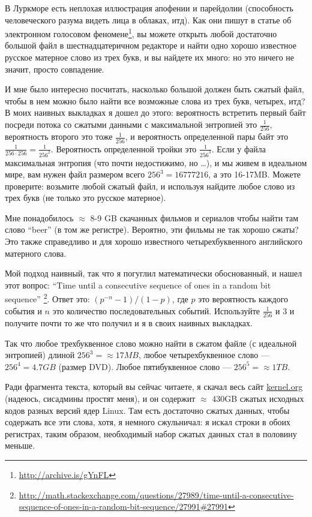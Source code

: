 В Луркморе есть неплохая иллюстрация апофении и парейдолии (способность человеческого разума видеть лица в облаках, итд).
Как они пишут в статье об электронном голосовом феномене\footnote{\url{http://archive.is/gYnFL}},
вы можете открыть любой достаточно большой файл в шестнадцатеричном редакторе и найти одно хорошо известное русское матерное слово из трех букв, и вы найдете их много: но это ничего не значит, просто совпадение.

И мне было интересно посчитать, насколько большой должен быть сжатый файл, чтобы в нем можно было найти все возможные слова из трех букв, четырех, итд?
В моих наивных выкладках я дошел до этого: вероятность встретить первый байт посреди потока со сжатыми данными с максимальной энтропией это 
$\frac{1}{256}$, вероятность второго это тоже $\frac{1}{256}$,
и вероятность определенной пары байт это $\frac{1}{256 \cdot 256} = \frac{1}{256^2}$.
Вероятность определенной тройки это $\frac{1}{256^3}$.
Если у файла максимальная энтропия (что почти недостижимо, но \dots), и мы живем в идеальном мире, вам нужен файл размером всего $256^3=16777216$, а это 16-17MB.
Можете проверите: возьмите любой сжатый файл, и используя  найдите любое слово из трех букв (не только это русское матерное).

Мне понадобилось $\approx$ 8-9 GB скачанных фильмов и сериалов чтобы найти там слово ``beer'' (в том же регистре).
Вероятно, эти фильмы не так хорошо сжаты?
Это также справедливо и для хорошо известного четырехбуквенного английского матерного слова.

Мой подход наивный, так что я погуглил математически обоснованный, и нашел этот вопрос:
``Time until a consecutive sequence of ones in a random bit sequence''
\footnote{\url{http://math.stackexchange.com/questions/27989/time-until-a-consecutive-sequence-of-ones-in-a-random-bit-sequence/27991#27991}}.
Ответ это: $(p^{−n}−1)/(1−p)$, где $p$ это вероятность каждого события и $n$ это количество последовательных событий.
Используйте $\frac{1}{256}$ и $3$ и получите почти то же что получил и я в своих наивных выкладках.

Так что любое трехбуквенное слово можно найти в сжатом файле (с идеальной энтропией) длиной $256^3 = \approx 17MB$, любое четырехбуквенное слово --- $256^4 = 4.7GB$ (размер DVD).
Любое пятибуквенное слово --- $256^5 = \approx 1TB$.

Ради фрагмента текста, который вы сейчас читаете, я скачал весь сайт \href{https://www.kernel.org/}{kernel.org} (надеюсь, сисадмины простят меня),
и он содержит $\approx$ 430GB сжатых исходных кодов разных версий ядер Linux.
Там есть достаточно сжатых данных, чтобы содержать все эти слова, хотя, я немного сжульничал: я искал строки в обоих регистрах, таким образом, необходимый набор сжатых данных стал в половину меньше.

